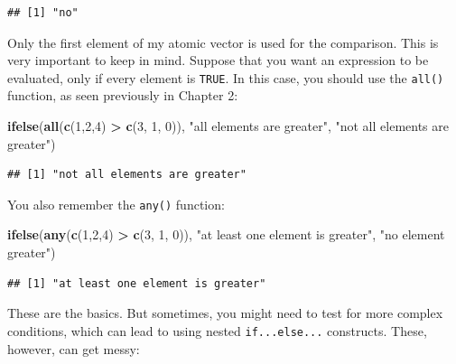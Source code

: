 \documentclass[]{gitbook}
\newenvironment{Shaded}{\begin{snugshade}}{\end{snugshade}}
\newcommand{\ControlFlowTok}[1]{\textcolor[rgb]{0.13,0.29,0.53}{\textbf{#1}}}
\newcommand{\DecValTok}[1]{\textcolor[rgb]{0.00,0.00,0.81}{#1}}
\newcommand{\KeywordTok}[1]{\textcolor[rgb]{0.13,0.29,0.53}{\textbf{#1}}}
\newcommand{\NormalTok}[1]{#1}
\newcommand{\OperatorTok}[1]{\textcolor[rgb]{0.81,0.36,0.00}{\textbf{#1}}}
\newcommand{\StringTok}[1]{\textcolor[rgb]{0.31,0.60,0.02}{#1}}
\begin{document}
\begin{verbatim}
## [1] "no"
\end{verbatim}

Only the first element of my atomic vector is used for the comparison. This is very important to keep in mind.
Suppose that you want an expression to be evaluated, only if every element is \texttt{TRUE}. In this case, you should
use the \texttt{all()} function, as seen previously in Chapter 2:

\begin{Shaded}
\begin{Highlighting}[]
\KeywordTok{ifelse}\NormalTok{(}\KeywordTok{all}\NormalTok{(}\KeywordTok{c}\NormalTok{(}\DecValTok{1}\NormalTok{,}\DecValTok{2}\NormalTok{,}\DecValTok{4}\NormalTok{) }\OperatorTok{>}\StringTok{ }\KeywordTok{c}\NormalTok{(}\DecValTok{3}\NormalTok{, }\DecValTok{1}\NormalTok{, }\DecValTok{0}\NormalTok{)), }\StringTok{"all elements are greater"}\NormalTok{, }\StringTok{"not all elements are greater"}\NormalTok{)}
\end{Highlighting}
\end{Shaded}

\begin{verbatim}
## [1] "not all elements are greater"
\end{verbatim}

You also remember the \texttt{any()} function:

\begin{Shaded}
\begin{Highlighting}[]
\KeywordTok{ifelse}\NormalTok{(}\KeywordTok{any}\NormalTok{(}\KeywordTok{c}\NormalTok{(}\DecValTok{1}\NormalTok{,}\DecValTok{2}\NormalTok{,}\DecValTok{4}\NormalTok{) }\OperatorTok{>}\StringTok{ }\KeywordTok{c}\NormalTok{(}\DecValTok{3}\NormalTok{, }\DecValTok{1}\NormalTok{, }\DecValTok{0}\NormalTok{)), }\StringTok{"at least one element is greater"}\NormalTok{, }\StringTok{"no element greater"}\NormalTok{)}
\end{Highlighting}
\end{Shaded}

\begin{verbatim}
## [1] "at least one element is greater"
\end{verbatim}

These are the basics. But sometimes, you might need to test for more complex conditions, which can lead to using
nested \texttt{if...else...} constructs. These, however, can get messy:

\begin{Shaded}
\end{Shaded}
\end{document}
